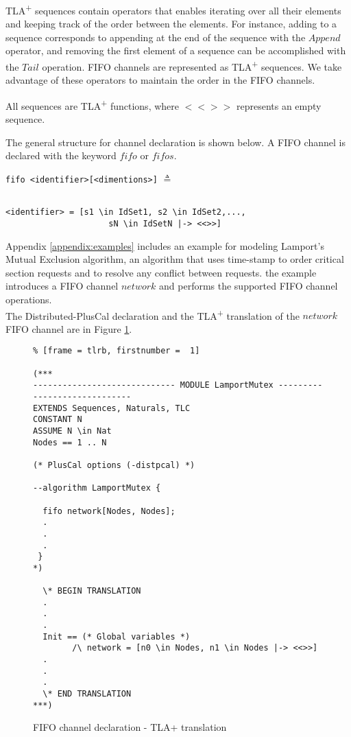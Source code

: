 \documentclass{thesul}
\newcommand{\tlaplus}{TLA\textsuperscript{+}\xspace}
\begin{document}
\tlaplus sequences contain operators that enables iterating over all their elements and keeping track of the order between the elements. For instance, adding to a sequence corresponds to appending at the end of the sequence with the $Append$ operator, and removing the first element of a sequence can be accomplished with the $Tail$ operation. FIFO channels are represented as \tlaplus sequences. We take advantage of these operators to maintain the order in the FIFO channels.

All sequences are \tlaplus functions, where $<<>>$ represents an empty sequence.

The general structure for channel declaration is shown below. A FIFO channel is declared with the keyword $fifo$ or $fifos$. 

\begin{minipage}{.35\textwidth}

\lstinline|fifo <identifier>[<dimentions>]| $\triangleq$
\end{minipage}\hfill
\begin{minipage}{.65\textwidth}
\begin{lstlisting}[frame = none, numbers = none]

<identifier> = [s1 \in IdSet1, s2 \in IdSet2,...,
					 sN \in IdSetN |-> <<>>]
\end{lstlisting}

\end{minipage}\hfill


Appendix \ref{appendix:examples} includes an example for  modeling Lamport's Mutual Exclusion algorithm, an algorithm that uses time-stamp to order critical section requests and to resolve any conflict between requests. the example introduces a FIFO channel $network$ and performs the supported FIFO channel operations. \\

The Distributed-PlusCal declaration and the \tlaplus translation of the $network$ FIFO channel are in Figure \ref{fifochannels}.

\FloatBarrier
\begin{figure}[!h]
\begin{lstlisting}% [frame = tlrb, firstnumber =  1]

(***
----------------------------- MODULE LamportMutex -----------------------------
EXTENDS Sequences, Naturals, TLC
CONSTANT N
ASSUME N \in Nat 
Nodes == 1 .. N

(* PlusCal options (-distpcal) *)
  
--algorithm LamportMutex { 

  fifo network[Nodes, Nodes];
  .
  .
  .
 }
*)
  
  \* BEGIN TRANSLATION 
  .
  .
  .
  Init == (* Global variables *)
        /\ network = [n0 \in Nodes, n1 \in Nodes |-> <<>>]
  .
  .
  .      
  \* END TRANSLATION 
***)

\end{lstlisting}
\caption{FIFO channel declaration - TLA+ translation}
\label{fifochannels}
\end{figure}
\FloatBarrier
\end{document}

